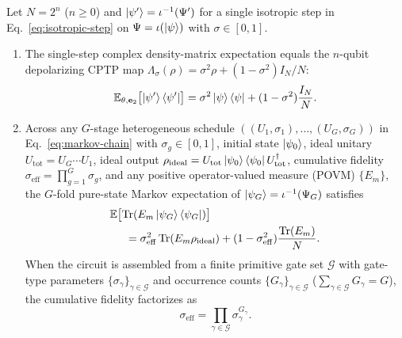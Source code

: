 \begin{theorem}
\label{thm:channel-duality}
Let $N = 2^n$ ($n \ge 0$) and $\ket{\psi'} = \iota^{-1}(\Psi')$ for a single isotropic step in Eq.~\eqref{eq:isotropic-step} on $\Psi = \iota(\ket{\psi})$ with $\sigma \in [0, 1]$.
\begin{enumerate}
\item The single-step complex density-matrix expectation equals the $n$-qubit depolarizing CPTP map $\Lambda_\sigma(\rho) = \sigma^2\rho + (1 - \sigma^2)I_N/N$:
\begin{equation}
\mathbb{E}_{\theta, \mathbf{e}_2}\bigl[\ket{\psi'}\bra{\psi'}\bigr] = \sigma^2 \ket{\psi}\bra{\psi} + (1 - \sigma^2)\frac{I_N}{N}.
\label{eq:channel-onestep}
\end{equation}
\item Across any $G$-stage heterogeneous schedule $((U_1, \sigma_1), \dots, (U_G, \sigma_G))$ in Eq.~\eqref{eq:markov-chain} with $\sigma_g \in [0, 1]$, initial state $\ket{\psi_0}$, ideal unitary $U_{\mathrm{tot}} = U_G \cdots U_1$, ideal output $\rho_{\mathrm{ideal}} = U_{\mathrm{tot}}\ket{\psi_0}\bra{\psi_0}U_{\mathrm{tot}}^\dagger$, cumulative fidelity $\sigma_{\mathrm{eff}} = \prod_{g=1}^G \sigma_g$, and any positive operator-valued measure (POVM) $\{E_m\}$, the $G$-fold pure-state Markov expectation of $\ket{\psi_G} = \iota^{-1}(\Psi_G)$ satisfies
\begin{align}
\MoveEqLeft[1.4] \E\bigl[\Tr(E_m \ket{\psi_G}\bra{\psi_G})\bigr] \nonumber \\
&= \sigma_{\mathrm{eff}}^2 \Tr(E_m \rho_{\mathrm{ideal}}) + (1 - \sigma_{\mathrm{eff}}^2)\frac{\Tr(E_m)}{N}.
\label{eq:heterogeneous-povm}
\end{align}
When the circuit is assembled from a finite primitive gate set $\mathcal{G}$ with gate-type parameters $\{\sigma_\gamma\}_{\gamma \in \mathcal{G}}$ and occurrence counts $\{G_\gamma\}_{\gamma \in \mathcal{G}}$ ($\sum_{\gamma \in \mathcal{G}} G_\gamma = G$), the cumulative fidelity factorizes as
\begin{equation}
\sigma_{\mathrm{eff}} = \prod_{\gamma \in \mathcal{G}} \sigma_\gamma^{G_\gamma}.
\label{eq:gate-count-prod}
\end{equation}
\end{enumerate}
\end{theorem}

